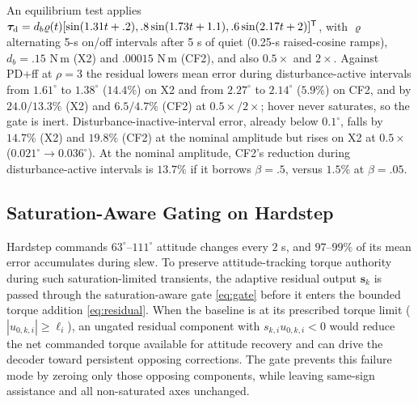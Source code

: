 \documentclass[letterpaper, 10 pt, conference]{ieeeconf}
\newcommand{\T}{^{\mathsf T}}
\begin{document}
\label{sec:disturbance}

An equilibrium test applies $\bm\tau_{\rm d}=d_b\varrho(t)[\sin(1.31t+.2),\allowbreak .8\sin(1.73t+1.1),\allowbreak.6\sin(2.17t+2)]\T$, with $\varrho$ alternating 5-s on/off intervals after 5 s of quiet (0.25-s raised-cosine ramps), $d_b=.15$ N\,m (X2) and $.00015$ N\,m (CF2), and also $0.5\times$ and $2\times$. Against PD+ff at $\rho=3$ the residual lowers mean error during disturbance-active intervals from $1.61^\circ$ to $1.38^\circ$ ($14.4\%$) on X2 and from $2.27^\circ$ to $2.14^\circ$ ($5.9\%$) on CF2, and by $24.0/13.3\%$ (X2) and $6.5/4.7\%$ (CF2) at $0.5\times/2\times$; hover never saturates, so the gate is inert. Disturbance-inactive-interval error, already below $0.1^\circ$, falls by $14.7\%$ (X2) and $19.8\%$ (CF2) at the nominal amplitude but rises on X2 at $0.5\times$ ($0.021^\circ\to0.036^\circ$). At the nominal amplitude, CF2's reduction during disturbance-active intervals is $13.7\%$ if it borrows $\beta=.5$, versus $1.5\%$ at $\beta=.05$.


\subsection{Saturation-Aware Gating on Hardstep}
\label{sec:failure}


Hardstep commands $63^\circ$--$111^\circ$ attitude changes every $2$ s, and $97$--$99\%$ of its mean error accumulates during slew. To preserve attitude-tracking torque authority during such saturation-limited transients, the adaptive residual output $\bm s_k$ is passed through the saturation-aware gate \eqref{eq:gate} before it enters the bounded torque addition \eqref{eq:residual}. When the baseline is at its prescribed torque limit ($|u_{0,k,i}|\ge\ell_i$), an ungated residual component with $s_{k,i}u_{0,k,i}<0$ would reduce the net commanded torque available for attitude recovery and can drive the decoder toward persistent opposing corrections. The gate prevents this failure mode by zeroing only those opposing components, while leaving same-sign assistance and all non-saturated axes unchanged.
\end{document}

